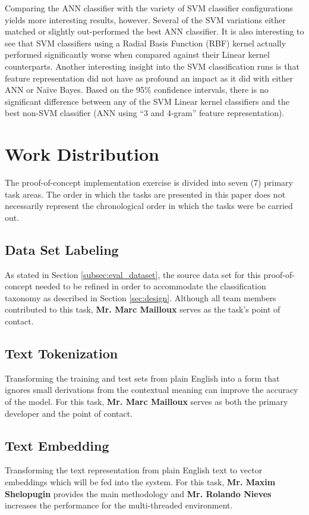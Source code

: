 \documentclass[conference]{sig-alternate-05-2015}
\begin{document}
Comparing the ANN classifier with the variety of SVM classifier configurations
yields more interesting results, however. Several of the SVM variations either
matched or slightly out-performed the best ANN classifier. It is also
interesting to see that SVM classifiers using a Radial Basis Function (RBF)
kernel actually performed significantly worse when compared against their Linear
kernel counterparts. Another interesting insight into the SVM classification
runs is that feature representation did not have as profound an impact as it
did with either ANN or Na\"ive Bayes. Based on the 95\% confidence intervals,
there is no significant difference between any of the SVM Linear kernel
classifiers and the best non-SVM classifier (ANN using ``3 and 4-gram''
feature representation).\par

\section{Work Distribution}\label{sec:plan_roles}
The proof-of-concept implementation exercise is divided into seven (7)
primary task areas. The order in which the tasks are presented in this paper
does not necessarily represent the chronological order in which the tasks were
be carried out.

\subsection{Data Set Labeling}\label{sec:labeling_task}
As stated in Section \ref{subsec:eval_dataset}, the source data set for this
proof-of-concept needed to be refined in order to accommodate the
classification taxonomy as described in Section \ref{sec:design}. Although all
team members contributed to this task, \textbf{Mr. Marc Mailloux} serves as the
task's point of contact.

\subsection{Text Tokenization}\label{sec:tokenization_task}
Transforming the training and test sets from plain English into a form that 
ignores small derivations from the contextual meaning can improve the accuracy
of the model. For this task, \textbf{Mr. Marc Mailloux} serves as both the primary 
developer and the point of contact. 

\subsection{Text Embedding}\label{sec:embedding_task}
Transforming the text representation from plain English text to vector embeddings
which will be fed into the system. For this task, \textbf{Mr. Maxim Shelopugin} 
provides the main methodology and \textbf{Mr. Rolando Nieves} increases the 
performance for the multi-threaded environment.
\end{document}
